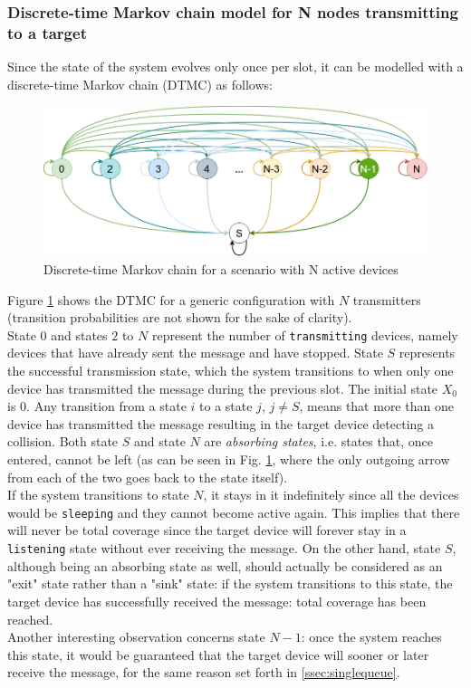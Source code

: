 \subsubsection{Discrete-time Markov chain model for N nodes transmitting to a target}
Since the state of the system evolves only once per slot, it can be modelled
with a discrete-time Markov chain (DTMC) as follows:
\begin{figure}[H]
    \begin{center}
        \includegraphics[scale=0.5]{img/DTMC.png}
        \caption{Discrete-time Markov chain for a scenario with N active devices}
        \label{fig:dtmc}
    \end{center}
\end{figure}
\noindent Figure \ref{fig:dtmc} shows the DTMC for a generic configuration with
$N$ transmitters (transition probabilities are not shown for the sake of clarity).\\
State $0$ and states $2$ to $N$ represent the number of \texttt{transmitting}
devices, namely devices that have already sent the message and have stopped. 
State $S$ represents the successful transmission state, which the system
transitions to when only one device has transmitted the message during the
previous slot.
The initial state $X_{0}$ is $0$. Any transition from a state $i$ to a state
$j$, $j \neq S$, means that more than one device has transmitted the message 
resulting in the target device detecting a collision.
Both state $S$ and state $N$ are \textit{absorbing states}, i.e. states that,
once entered, cannot be left (as can be seen in Fig. \ref{fig:dtmc}, where the
only outgoing arrow from each of the two goes back to the state itself).\\
If the system transitions to state $N$, it stays in it indefinitely since all
the devices would be \texttt{sleeping} and they cannot become active again. This
implies that there will never be total coverage since the target device will
forever stay in a \texttt{listening} state without ever receiving the message.
On the other hand, state $S$, although being an absorbing state as well, should
actually be considered as an "exit" state rather than a "sink" state: if the
system transitions to this state, the target device has successfully received
the message: total coverage has been reached.\\
Another interesting observation concerns state $N - 1$: once the system reaches
this state, it would be guaranteed that the target device will sooner or later
receive the message, for the same reason set forth in \ref{ssec:singlequeue}.
